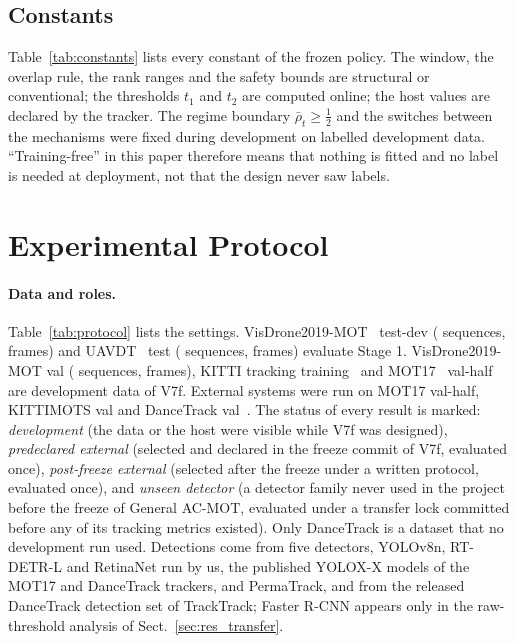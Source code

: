 \documentclass[pdflatex,sn-mathphys-num]{sn-jnl}
\begin{document}
\subsection{Constants}\label{sec:constants}
Table~\ref{tab:constants} lists every constant of the frozen policy. The window, the overlap rule, the rank ranges and the safety bounds are structural or conventional; the thresholds $t_1$ and $t_2$ are computed online; the host values are declared by the tracker. The regime boundary $\bar\rho_t\ge\frac12$ and the switches between the mechanisms were fixed during development on labelled development data. ``Training-free'' in this paper therefore means that nothing is fitted and no label is needed at deployment, not that the design never saw labels.



\section{Experimental Protocol}\label{sec:protocol}
\paragraph{Data and roles.} Table~\ref{tab:protocol} lists the settings. VisDrone2019-MOT~\cite{zhu2022visdrone} test-dev ( sequences,  frames) and UAVDT~\cite{du2018uavdt} test ( sequences,  frames) evaluate Stage 1. VisDrone2019-MOT val ( sequences,  frames), KITTI tracking training~\cite{geiger2012kitti} and MOT17~\cite{milan2016mot16} val-half are development data of V7f. External systems were run on MOT17 val-half, KITTIMOTS val and DanceTrack val~\cite{sun2022dancetrack}. The status of every result is marked: \emph{development} (the data or the host were visible while V7f was designed), \emph{predeclared external} (selected and declared in the freeze commit of V7f, evaluated once), \emph{post-freeze external} (selected after the freeze under a written protocol, evaluated once), and \emph{unseen detector} (a detector family never used in the project before the freeze of General AC-MOT, evaluated under a transfer lock committed before any of its tracking metrics existed). Only DanceTrack is a dataset that no development run used. Detections come from five detectors, YOLOv8n, RT-DETR-L and RetinaNet run by us, the published YOLOX-X models of the MOT17 and DanceTrack trackers, and PermaTrack, and from the released DanceTrack detection set of TrackTrack; Faster R-CNN appears only in the raw-threshold analysis of Sect.~\ref{sec:res_transfer}.
\end{document}
